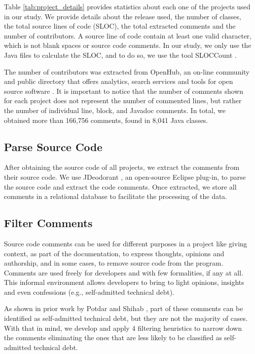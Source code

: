 Table \ref{tab:project_details} provides statistics about each one of the projects used in our study. We provide details about the release used, the number of classes, the total source lines of code (SLOC), the total extracted comments and the number of contributors. A source line of code contain at least one valid character, which is not blank spaces or source code comments. In our study, we only use the Java files to calculate the SLOC, and to do so, we use the tool SLOCCount \cite{wheeler2004:home}. 

The number of contributors was extracted from OpenHub, an on-line community and public directory that offers analytics, search services and tools for open source software \cite{Openhub:home}. It is important to notice that the number of comments shown for each project does not represent the number of commented lines, but rather the number of individual line, block, and Javadoc comments. In total, we obtained more than 166,756 comments, found in 8,041 Java classes.
 
\subsection{Parse Source Code} %
\label{sub:parse_source_code}
After obtaining the source code of all projects, we extract the comments from their source code. We use JDeodorant \cite{Tsantalis2008CSMR}, an open-source Eclipse plug-in, to parse the source code and extract the code comments. Once extracted, we store all comments in a relational database to facilitate the processing of the data.

\subsection{Filter Comments} %
\label{sub:filter_comments}

Source code comments can be used for different purposes in a project like giving context, as part of the documentation, to express thoughts, opinions and authorship, and in some cases, to remove source code from the program. Comments are used freely for developers and with few formalities, if any at all. This informal environment allows developers to bring to light opinions, insights and even confessions (e.g., self-admitted technical debt). 

As shown in prior work by Potdar and Shihab \cite{Potdar2014ICSME}, part of these comments can be identified as self-admitted technical debt, but they are not the majority of cases. With that in mind, we develop and apply 4 filtering heuristics to narrow down the comments eliminating the ones that are less likely to be classified as self-admitted technical debt.

